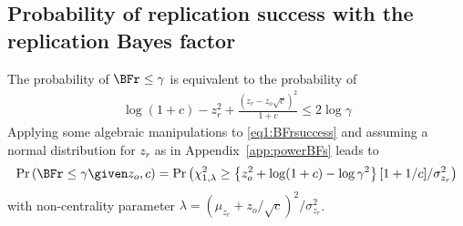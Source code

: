 \begin{subappendices}
\section{Probability of replication success with the replication Bayes factor}
\label{app:powerBFr}
The probability of $\BFr \leq \gamma$ is equivalent to the probability of
\begin{align}
  \label{eq1:BFrsuccess}
  \log(1 + c) - z_{r}^{2} + \frac{(z_{r} - z_{o}\sqrt{c})^{2}}{1 + c}
  \leq  2 \log \gamma
\end{align}
Applying some algebraic manipulations to \eqref{eq1:BFrsuccess} and assuming a
normal distribution for $z_{r}$ as in Appendix~\ref{app:powerBFs} leads to
\begin{align*}
  \Pr\left(\BFr \leq \gamma \given z_o, c\right) =
  \Pr\left(\chi^2_{1,\lambda} \geq \left\{z_{o}^{2} + \log(1 + c) - \log \gamma^{2}
  \right\} [1 + 1/c] / \sigma^2_{z_r}\right)
\end{align*}
with non-centrality parameter $\lambda = (\mu_{z_r} + z_{o}/\sqrt{c})^2/\sigma^2_{z_r}$.

\end{subappendices}




